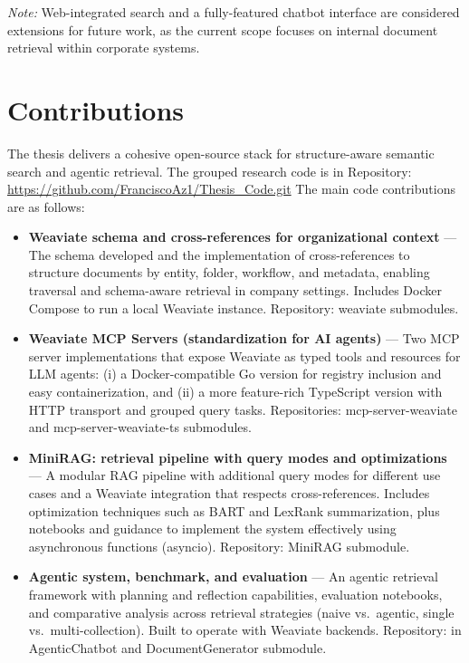\textit{Note:} Web-integrated search and a fully-featured chatbot interface are considered extensions for future work, as the current scope focuses on internal document retrieval within corporate systems.

\section{Contributions}
The thesis delivers a cohesive open-source stack for structure-aware semantic search and agentic retrieval.
The grouped research code is in Repository: \url{https://github.com/FranciscoAz1/Thesis_Code.git}
The main code contributions are as follows:

\begin{itemize}
	\item \textbf{Weaviate schema and cross-references for organizational context} — The schema developed and the implementation of cross-references to structure documents by entity, folder, workflow, and metadata, enabling traversal and schema-aware retrieval in company settings. Includes Docker Compose to run a local Weaviate instance. Repository: weaviate submodules.

	\item \textbf{Weaviate MCP Servers (standardization for AI agents)} — Two \gls{MCP} server implementations that expose Weaviate as typed tools and resources for LLM agents: (i) a Docker-compatible Go version for registry inclusion and easy containerization, and (ii) a more feature-rich TypeScript version with HTTP transport and grouped query tasks. Repositories: mcp-server-weaviate and mcp-server-weaviate-ts submodules.

	\item \textbf{MiniRAG: retrieval pipeline with query modes and optimizations} — A modular RAG pipeline with additional query modes for different use cases and a Weaviate integration that respects cross-references. Includes optimization techniques such as BART and LexRank summarization, plus notebooks and guidance to implement the system effectively using asynchronous functions (asyncio). Repository: MiniRAG submodule.

	\item \textbf{Agentic system, benchmark, and evaluation} — An agentic retrieval framework with planning and reflection capabilities, evaluation notebooks, and comparative analysis across retrieval strategies (naive vs.\ agentic, single vs.\ multi-collection). Built to operate with Weaviate backends. Repository: in AgenticChatbot and DocumentGenerator submodule.
\end{itemize}


